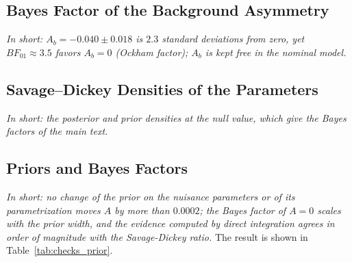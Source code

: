 \subsection{Bayes Factor of the Background Asymmetry}
\emph{In short: $A_b=-0.040\pm0.018$ is $2.3$ standard deviations from zero, yet $BF_{01}\approx3.5$ favors $A_b=0$ (Ockham factor); $A_b$ is kept free in the nominal model.}

\subsection{Savage--Dickey Densities of the Parameters}
\label{app:sd_densities}
\emph{In short: the posterior and prior densities at the null value, which give the Bayes factors of the main text.}

\subsection{Priors and Bayes Factors}
\label{sec:checks_prior}
\emph{In short: no change of the prior on the nuisance parameters or of its parametrization moves $A$ by more than $0.0002$; the Bayes factor of $A=0$ scales with the prior width, and the evidence computed by direct integration agrees in order of magnitude with the Savage-Dickey ratio.}
The result is shown in Table~\ref{tab:checks_prior}.

\begin{table}[h]
\centering
{}
\caption{Posterior of $A$ under alternative priors, by importance reweighting of the chain; ESS: effective sample size of the $20{,}000$ thinned samples.}
\label{tab:checks_prior}
\end{table}

